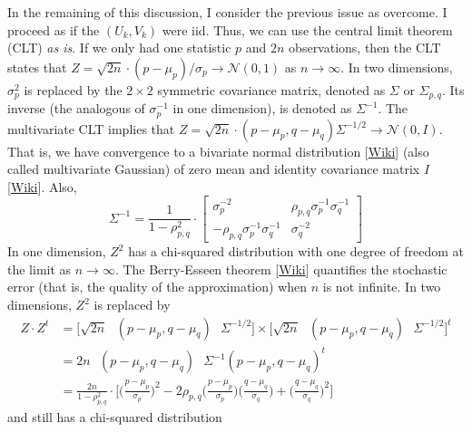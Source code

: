 \documentclass[10pt]{article}
\begin{document}
\begin{Exercise}
In the remaining of this discussion, I consider the previous issue as overcome. I proceed as if the $(U_k,V_k)$ were iid. Thus, we can use the central limit theorem (CLT) {\em as is}.
If we only had one statistic $p$ and $2n$ observations, then  the CLT states that
$Z=\sqrt{2n}\cdot(p-\mu_p)/\sigma_p\rightarrow \mathcal{N}(0,1)$
 as $n\rightarrow\infty$. In two dimensions, $\sigma_p^2$ is replaced by the $2\times 2$ symmetric covariance matrix, denoted as $\Sigma$ or $\Sigma_{p,q}$. Its inverse (the analogous of $\sigma_p^{-1}$ in one dimension), is denoted as $\Sigma^{-1}$. The multivariate CLT implies that
$Z = \sqrt{2n} \cdot (p-\mu_p, q-\mu_q)\Sigma^{-1/2}\rightarrow \mathcal{N}(0,I)$. That is, we have convergence to a
\textcolor{index}{bivariate normal distribution} [\href{https://en.wikipedia.org/wiki/Multivariate_normal_distribution}{Wiki}]
(also called
\textcolor{index}{multivariate Gaussian})  of zero mean and identity
\textcolor{index}{covariance matrix} $I$ [\href{https://en.wikipedia.org/wiki/Covariance_matrix}{Wiki}].  Also,
$$\Sigma^{-1}= \frac{1}{1-\rho_{p,q}^2} \cdot
\begin{bmatrix}
\sigma_p^{-2} & \rho_{p,q} \sigma_p^{-1} \sigma_q^{-1}\\
-\rho_{p,q} \sigma_p^{-1}\sigma_q^{-1}  & \sigma_q^{-2}
\end{bmatrix}
$$
In one dimension, $Z^2$ has a chi-squared distribution with one degree of freedom at the limit as $n\rightarrow\infty$. The
\textcolor{index}{Berry-Esseen theorem} [\href{https://bit.ly/3Jsq0Ow}{Wiki}]
quantifies the stochastic error (that is, the quality of the approximation) when $n$ is not infinite. In two dimensions,  $Z^2$ is replaced by
\begin{align}
Z\cdot Z^t & =\Big[\sqrt{2n}\mbox{ }(p-\mu_p, q-\mu_q)\mbox{ }\Sigma^{-1/2}\Big] \times \Big[\sqrt{2n}\mbox{ }(p-\mu_p, q-\mu_q)\mbox{ }\Sigma^{-1/2}\Big]^t  \nonumber \\
  & = 2n\mbox{ } (p-\mu_p, q-\mu_q)\mbox{ }\Sigma^{-1}(p-\mu_p, q-\mu_q)^t \nonumber \\
 & = \frac{2n}{1-\rho_{p,q}^2}\cdot
\Big[\Big( \frac{p-\mu_p}{\sigma_p}\Big)^2
-2\rho_{p,q}\Big(\frac{p-\mu_p}{\sigma_p}\Big)\Big(\frac{q-\mu_q}{\sigma_q}\Big)
+ \Big(\frac{q-\mu_q}{\sigma_q}\Big)^2\Big]  \nonumber
\end{align}
and still has a \textcolor{index}{chi-squared distribution}

\end{Exercise}
\end{document}
